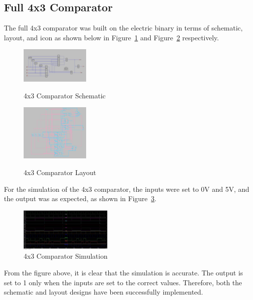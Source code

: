 \documentclass[conference]{IEEEtran}
\begin{document}
\subsection{Full 4x3 Comparator}
The full 4x3 comparator was built on the electric binary in terms of schematic, layout, and icon as shown below in Figure~\ref{fig:4x3ComparatorSchematic} and Figure~\ref{fig:4x3ComparatorLayout} respectively.
\begin{figure}[h]
    \centering
    \includegraphics[width=0.3\textwidth]{assets/4x3ComparatorSchematic.jpg}\label{fig:4x3ComparatorSchematic}
    \caption{4x3 Comparator Schematic}
    \label{fig:4x3ComparatorSchematic}
\end{figure}
\begin{figure}[h]
    \centering
    \includegraphics[width=0.3\textwidth]{assets/4x3ComparatorLayout.jpg}\label{fig:4x3ComparatorLayout}
    \caption{4x3 Comparator Layout}
    \label{fig:4x3ComparatorLayout}
\end{figure}

For the simulation of the 4x3 comparator, the inputs were set to 0V and 5V, and the output was as expected, as shown in Figure~\ref{fig:4x3ComparatorSimulation}.
\begin{figure}[h]
    \centering
    \includegraphics[width=0.4\textwidth]{assets/4x3ComparatorSimulation.jpg}
    \caption{4x3 Comparator Simulation}
    \label{fig:4x3ComparatorSimulation}
\end{figure}

From the figure above, it is clear that the simulation is accurate. The output is set to 1 only when the inputs are set to the correct values. Therefore, both the schematic and layout designs have been successfully implemented.
\end{document}

